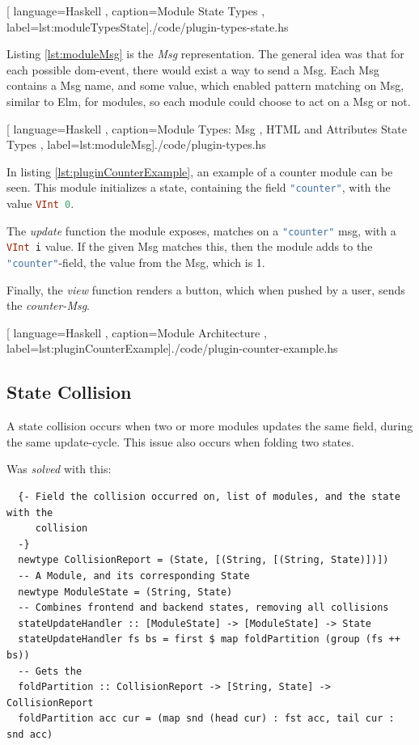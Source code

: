 \begin{center}
  
    [ language=Haskell
    , caption={Module State Types}
    , label=lst:moduleTypesState]{./code/plugin-types-state.hs}
\end{center}

Listing \ref{lst:moduleMsg} is the \textit{Msg} representation. The general idea
was that for each possible \gls{dom}-event, there would exist a way to send a
Msg. Each Msg contains a Msg name, and some value, which enabled pattern
matching on Msg, similar to Elm, for modules, so each module could choose to act
on a Msg or not.

\begin{center}
  \centering
  
    [ language=Haskell
    , caption={Module Types: Msg
    , HTML and Attributes State Types}
    , label=lst:moduleMsg]{./code/plugin-types.hs}
\end{center}

In listing \ref{lst:pluginCounterExample}, an example of a counter module can be
seen. This module initializes a state, containing the field
\lstinline[language=Haskell]{"counter"}, with the value
\lstinline[language=Haskell]{VInt 0}.

The \textit{update} function the module exposes, matches on a
\lstinline[language=Haskell]{"counter"} msg, with a
\lstinline[language=Haskell]{VInt i} value. If the given Msg matches this, then
the module adds to the \lstinline[language=Haskell]{"counter"}-field, the value
from the Msg, which is 1.

Finally, the \textit{view} function renders a button, which when pushed by a
user, sends the \textit{counter-Msg}.

\begin{center}
  
    [ language=Haskell
    , caption={Module Architecture}
    , label=lst:pluginCounterExample]{./code/plugin-counter-example.hs}
\end{center}

\subsection{State Collision}

A state collision occurs when two or more modules updates the same field, during
the same update-cycle. This issue also occurs when folding two states.

Was \textit{solved} with this:

\begin{verbatim}
  {- Field the collision occurred on, list of modules, and the state with the
     collision
  -}
  newtype CollisionReport = (State, [(String, [(String, State)])])
  -- A Module, and its corresponding State
  newtype ModuleState = (String, State)
  -- Combines frontend and backend states, removing all collisions
  stateUpdateHandler :: [ModuleState] -> [ModuleState] -> State
  stateUpdateHandler fs bs = first $ map foldPartition (group (fs ++ bs))
  -- Gets the
  foldPartition :: CollisionReport -> [String, State] -> CollisionReport
  foldPartition acc cur = (map snd (head cur) : fst acc, tail cur : snd acc)
\end{verbatim}

